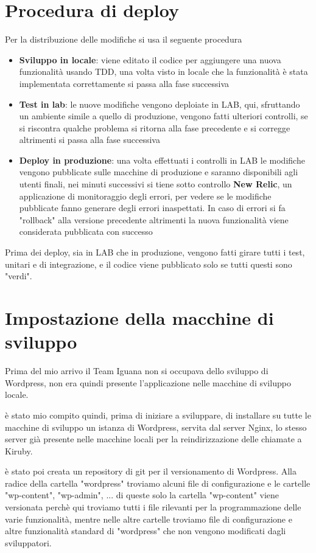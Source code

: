 \section{Procedura di deploy}
Per la distribuzione delle modifiche si usa il seguente procedura
\begin{itemize}
\item {\bf Sviluppo in locale}: viene editato il codice per aggiungere una nuova funzionalità usando
TDD, una volta visto in locale che la funzionalità è stata implementata correttamente si passa alla fase successiva
\item {\bf Test in lab}: le nuove modifiche vengono deploiate in LAB, qui, sfruttando un ambiente simile a quello di 
produzione, vengono fatti ulteriori controlli, se si riscontra qualche problema si ritorna alla fase precedente e si corregge
altrimenti si passa alla fase successiva 
\item {\bf Deploy in produzione}: una volta effettuati i controlli in LAB le modifiche vengono pubblicate sulle macchine
di produzione e saranno disponibili agli utenti finali, nei minuti successivi si tiene sotto controllo {\bf New Relic}, un
applicazione di monitoraggio degli errori, per vedere se le modifiche pubblicate fanno generare degli errori inaspettati.
In caso di errori si fa "rollback" alla versione precedente altrimenti la nuova funzionalità viene considerata pubblicata con successo
\end{itemize}

Prima dei deploy, sia in LAB che in produzione, vengono fatti girare tutti i test, unitari e di integrazione, e il codice viene pubblicato solo se tutti questi sono "verdi".

\section{Impostazione della macchine di sviluppo}

Prima del mio arrivo il Team Iguana non si occupava dello sviluppo di Wordpress, non era quindi presente
l'applicazione nelle macchine di sviluppo locale.

è stato mio compito quindi, prima di iniziare a sviluppare, di installare su tutte le macchine di sviluppo
un istanza di Wordpress, servita dal server Nginx, lo stesso server già presente nelle macchine locali per
la reindirizzazione delle chiamate a Kiruby.

è stato poi creata un repository di git per il versionamento di Wordpress. 
Alla radice della cartella "wordpress" troviamo alcuni file di configurazione e le cartelle "wp-content", "wp-admin", ... di queste solo la
cartella "wp-content" viene versionata perchè qui troviamo tutti i file rilevanti per la programmazione delle varie funzionalità, mentre nelle
altre cartelle troviamo file di configurazione e altre funzionalità standard di "wordpress" che non vengono modificati dagli sviluppatori.

